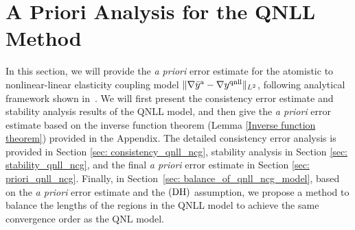 \section{A Priori Analysis for the QNLL Method}
\label{sec: anal_qnll_ncg}


In this section, we will provide the {\it a priori} error estimate for the atomistic to nonlinear-linear elasticity coupling model $\Vert \nabla \bar{y}^{{\rm a}} - \nabla y^{{\rm qnll}} \Vert_{L^{2}}$, following analytical framework shown in~\cite{2013_ML_CO_AC_Coupling_ACTANUM,2011_CO_1D_QNL_MATHCOMP,2011_CO_HW_QC_A_Priori_1D_M3AS}. We will first present the consistency error estimate and stability analysis results of the QNLL model, and then give the {\it a priori} error estimate based on the inverse function theorem (Lemma \ref{Inverse function theorem}) provided in the Appendix. The detailed consistency error analysis is provided in Section \ref{sec: consistency_qnll_ncg}, stability analysis in Section \ref{sec: stability_qnll_ncg}, and the final {\it a priori} error estimate in Section \ref{sec: priori_qnll_ncg}. Finally, in Section~\ref{sec: balance_of_qnll_ncg_model}, based on the {\it a priori} error estimate and the $ \textbf{\rm (DH)} $ assumption, we propose a method to balance the lengths of the regions in the QNLL model to achieve the same convergence order as the QNL model.








